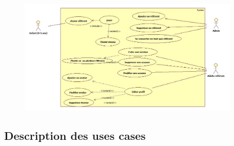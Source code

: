 \documentclass[12pt,a4paper]{report}
\begin{document}
\begin{figure}[!h]
\centering
\includegraphics[width=400px]{UseCaseDiagram2.jpg}
\end{figure}

\subsection{Description des uses cases}
\end{document}
